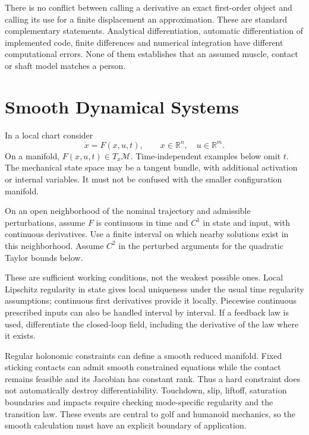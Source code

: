 There is no conflict between calling a derivative an exact first-order object and calling
its use for a finite displacement an approximation. These are standard complementary
statements. Analytical differentiation, automatic differentiation of implemented code,
finite differences and numerical integration have different computational errors. None
of them establishes that an assumed muscle, contact or shaft model matches a person.

\section{Smooth Dynamical Systems}

In a local chart consider
\begin{equation}
\dot x=F(x,u,t),\qquad x\in\mathbb R^n,\quad u\in\mathbb R^m.
\label{eq:ch1:dynamics}
\end{equation}
On a manifold, $F(x,u,t)\in T_x\mathcal M$. Time-independent examples below omit $t$.
The mechanical state space may be a tangent bundle, with additional activation or internal
variables. It must not be confused with the smaller configuration manifold.

\begin{assumption}\label{ass:smoothness}
On an open neighborhood of the nominal trajectory and admissible perturbations, assume
$F$ is continuous in time and $C^1$ in state and input, with continuous derivatives.
Use a finite interval on which nearby solutions exist in this neighborhood. Assume $C^2$
in the perturbed arguments for the quadratic Taylor bounds below.
\end{assumption}

These are sufficient working conditions, not the weakest possible ones. Local Lipschitz
regularity in state gives local uniqueness under the usual time regularity assumptions;
continuous first derivatives provide it locally. Piecewise continuous prescribed inputs
can also be handled interval by interval. If a feedback law is used, differentiate the
closed-loop field, including the derivative of the law where it exists.

Regular holonomic constraints can define a smooth reduced manifold. Fixed sticking contacts
can admit smooth constrained equations while the contact remains feasible and its Jacobian
has constant rank. Thus a hard constraint does not automatically destroy differentiability.
Touchdown, slip, liftoff, saturation boundaries and impacts require checking mode-specific
regularity and the transition law. These events are central to golf and humanoid mechanics,
so the smooth calculation must have an explicit boundary of application.

